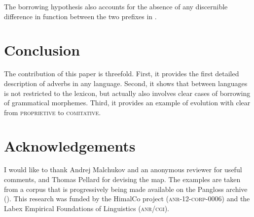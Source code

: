 \documentclass[output=paper]{langsci/langscibook}
\begin{document}
The borrowing hypothesis also accounts for the absence of any discernible difference in function between the two  prefixes in .

\section{Conclusion} 
The contribution of this paper is threefold. First, it provides the first detailed description of  adverbs in any  language. Second, it shows that  between  languages is not restricted to the lexicon, but actually also involves clear cases of borrowing of grammatical morphemes. Third, it provides an example of evolution with clear  from \textsc{proprietive} to \textsc{comitative}.

\section*{Acknowledgements}
I would like to thank Andrej Malchukov and an anonymous reviewer for useful comments, and Thomas Pellard for devising the map. The examples are taken from a corpus that is progressively being made available on the Pangloss archive (\citealt{michailovsky14pangloss}). This research was funded by the HimalCo project (\textsc{anr-12-corp-0006}) and  the Labex Empirical Foundations of Linguistics (\textsc{anr\slash cgi}).
 
{\sloppy
\printbibliography[heading=subbibliography,notkeyword=this]
}
\end{document}

